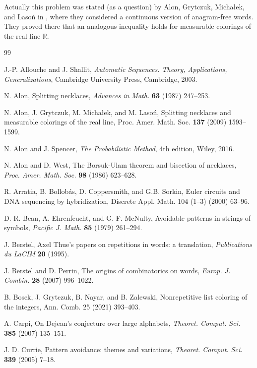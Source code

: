\documentclass[12pt]{amsart}
\theoremstyle{plain}
\numberwithin{equation}{section}
\begin{document}
Actually this problem was stated (as a question) by Alon, Grytczuk, Michałek, and Lasoń in \cite{AlonGML}, where they considered a continuous version of anagram-free words. They proved there that an analogous inequality holds for measurable colorings of the real line $\mathbb{R}$.

\begin{thebibliography}{99}
	
 J.-P. Allouche and J. Shallit, {\it Automatic Sequences. Theory, Applications, Generalizations}, Cambridge University Press, Cambridge, 2003.
	
 N. Alon, Splitting necklaces, {\it Advances in Math.} {\bf 63} (1987) 247--253.

 N. Alon, J. Grytczuk, M. Michałek, and M. Lasoń, Splitting necklaces and measurable colorings of the real line, Proc. Amer. Math. Soc. {\bf137} (2009) 1593--1599.

 N. Alon and J. Spencer, \emph{The Probabilistic Method}, 4th edition, Wiley, 2016.

 N. Alon and D. West, The Borsuk-Ulam theorem and bisection of necklaces, {\it Proc. Amer. Math. Soc.} {\bf 98} (1986) 623--628.

 R. Arratia, B. Bollob\'{a}s, D. Coppersmith, and G.B. Sorkin, Euler circuits and DNA sequencing by hybridization, Discrete Appl. Math. 104 (1–3) (2000) 63--96.

 D. R. Bean, A. Ehrenfeucht, and G. F. McNulty, Avoidable patterns in strings of symbols, {\it Pacific J. Math.} {\bf85} (1979) 261--294.

 J. Berstel, Axel Thue's papers on repetitions in words: a translation, {\it Publications du LaCIM} {\bf 20} (1995).

 J. Berstel and D. Perrin, The origins of combinatorics on words, {\it Europ. J. Combin.} {\bf 28} (2007) 996--1022.

 B. Bosek, J. Grytczuk, B. Nayar, and B. Zalewski, Nonrepetitive list coloring of the integers, Ann. Comb. 25 (2021) 393--403.

 A. Carpi, On Dejean's conjecture over large alphabets, {\it Theoret. Comput. Sci.} {\bf 385} (2007) 135--151.

 J. D. Currie, Pattern avoidance: themes and variations, {\it Theoret. Comput. Sci.} {\bf 339} (2005) 7--18.


\end{thebibliography}
\end{document}
